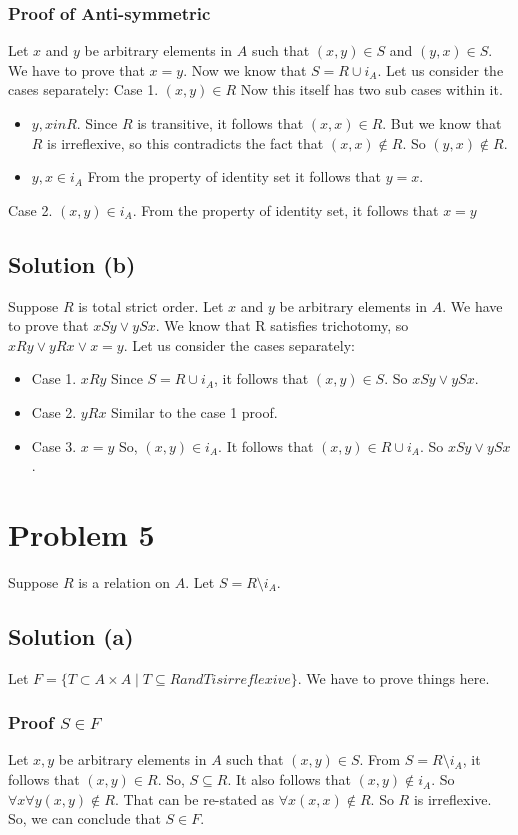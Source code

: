 \documentclass{article}
\begin{document}
\subsubsection{Proof of Anti-symmetric}
Let $x$ and $y$ be arbitrary elements in $A$ such that $(x,y) \in S$
and $(y,x) \in S$. We have to prove that $x = y$. Now we know
that $S = R \cup i_A$. Let us consider the cases separately:
Case 1. $(x,y) \in R$ Now this itself has two sub cases within it.
\begin{itemize}
\item $y,x in R$. Since $R$ is transitive, it follows that $(x,x) \in
  R$. But we know that $R$ is irreflexive, so this contradicts the
  fact that $(x,x) \notin R$. So $(y,x) \notin R$.
\item $y,x \in i_A$ From the property of identity set it follows that
  $y = x$. 
\end{itemize}
Case 2. $(x,y) \in i_A$. From the property of identity set, it follows
that $x = y$

\subsection{Solution (b)}
Suppose $R$ is total strict order. Let $x$ and $y$ be arbitrary
elements in $A$. We have to prove that $xSy \lor ySx$. We know that R
satisfies trichotomy, so $xRy \lor yRx \lor x = y$. Let us consider
the cases separately:
\begin{itemize}
\item Case 1. $xRy$ Since $S = R \cup i_A$, it follows that $(x,y) \in
  S$. So $xSy \lor ySx$.
\item Case 2. $yRx$ Similar to the case 1 proof.
\item Case 3. $x = y$ So, $(x,y) \in i_A$. It follows that $(x,y) \in
  R \cup i_A$. So $xSy \lor ySx$.
\end{itemize}

\section{Problem 5}
Suppose $R$ is a relation on $A$. Let $S = R \setminus i_A$.
\subsection{Solution (a)}
Let
$F = \{T \subset A \times A \mid T \subseteq R and T is
irreflexive\}$. We have to prove things here.
\subsubsection{Proof $S \in F$}
Let $x,y$ be arbitrary elements in $A$ such that $(x,y) \in S$. From
$S = R \setminus i_A$, it follows that $(x,y) \in R$. So, $S \subseteq
R$. It also follows that $(x,y) \notin i_A$. So $\forall x \forall y
(x,y) \notin R$. That can be re-stated as $\forall x (x,x) \notin R$.
So $R$ is irreflexive. So, we can conclude that $S \in F$.
\end{document}
